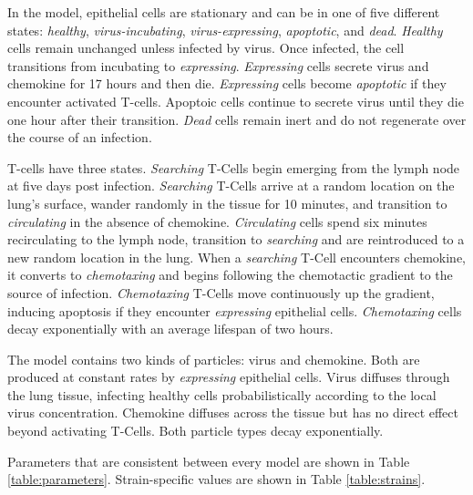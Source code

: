 \documentclass[10pt]{article}
\begin{document}
In the model, epithelial cells are stationary and can be in one of five different states: \emph{healthy}, \emph{virus-incubating}, \emph{virus-expressing}, \emph{apoptotic}, and \emph{dead}. \emph{Healthy} cells remain unchanged unless infected by virus. Once infected, the cell transitions from {incubating} to \emph{expressing}. \emph{Expressing} cells secrete virus and chemokine for 17 hours and then die. \emph{Expressing} cells become \emph{apoptotic} if they encounter activated T-cells. Apoptoic cells continue to secrete virus until they die one hour after their transition. \emph{Dead} cells remain inert and do not regenerate over the course of an infection.

T-cells have three states. \emph{Searching} T-Cells begin emerging from the lymph node at five days post infection. \textit{Searching} T-Cells arrive at a random location on the lung's surface, wander randomly in the tissue for 10 minutes, and transition to \emph{circulating} in the absence of chemokine. \emph{Circulating} cells spend six minutes recirculating to the lymph node, transition to \emph{searching} and are reintroduced to a new random location in the lung. When a \emph{searching} T-Cell encounters chemokine, it converts to \emph{chemotaxing} and begins following the chemotactic gradient to the source of infection. \emph{Chemotaxing} T-Cells move continuously up the gradient, inducing apoptosis if they encounter \emph{expressing} epithelial cells. \emph{Chemotaxing} cells decay exponentially with an average lifespan of two hours. 

The model contains two kinds of particles: virus and chemokine. Both are produced at constant rates by \emph{expressing} epithelial cells.  Virus diffuses through the lung tissue, infecting healthy cells probabilistically according to the local virus concentration. Chemokine diffuses across the tissue but has no
direct effect beyond activating T-Cells. Both particle types decay exponentially.

Parameters that are consistent between every model are shown in Table \ref{table:parameters}.  Strain-specific values are shown in Table \ref{table:strains}.
\end{document}
